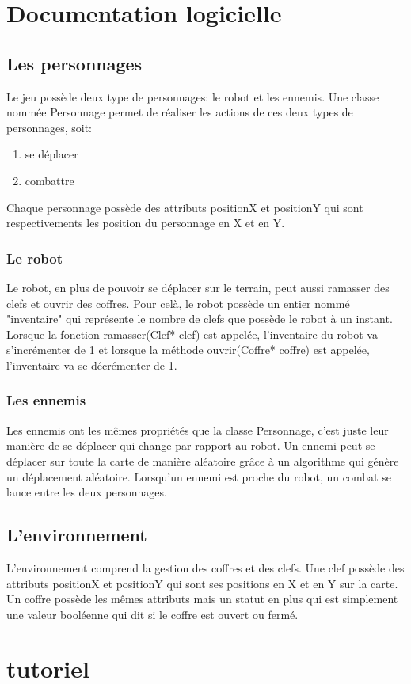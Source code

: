 \documentclass[a4paper 12pts]{article}
\begin{document}
\section{Documentation logicielle}



\subsection{Les personnages}
Le jeu possède deux type de personnages: le robot et les ennemis. Une classe nommée Personnage permet de réaliser les actions de ces deux types de personnages, soit:
\begin{enumerate}
	\item se déplacer
	\item combattre
\end{enumerate}
Chaque personnage possède des attributs positionX et positionY qui sont respectivements les position du personnage en X et en Y.

\subsubsection{Le robot}
Le robot, en plus de pouvoir se déplacer sur le terrain, peut aussi ramasser des clefs et ouvrir des coffres.
Pour celà, le robot possède un entier nommé "inventaire" qui représente le nombre de clefs que possède le robot à un instant.
Lorsque la fonction ramasser(Clef* clef) est appelée, l'inventaire du robot va s'incrémenter de 1 et lorsque la méthode ouvrir(Coffre* coffre)
est appelée, l'inventaire va se décrémenter de 1.

\subsubsection{Les ennemis}
Les ennemis ont les mêmes propriétés que la classe Personnage, c'est juste leur manière de se déplacer qui change par rapport au robot. 
Un ennemi peut se déplacer sur toute la carte de manière aléatoire grâce à un algorithme qui génère un déplacement aléatoire.
Lorsqu'un ennemi est proche du robot, un combat se lance entre les deux personnages.


\subsection{L'environnement}
L'environnement comprend la gestion des coffres et des clefs.
Une clef possède des attributs positionX et positionY qui sont ses positions en X et en Y sur la carte. 
Un coffre possède les mêmes attributs mais un statut en plus qui est simplement une valeur booléenne qui dit si le coffre est ouvert ou fermé.


\section{tutoriel}
\end{document}
